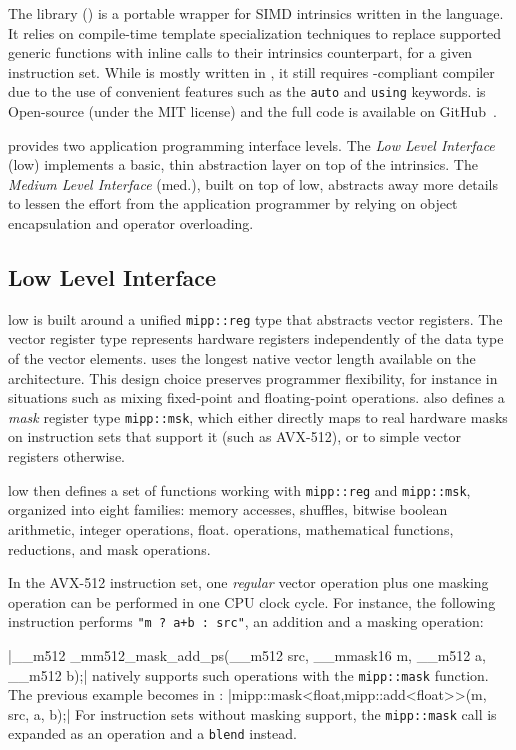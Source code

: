 The \longMIPP library (\MIPP) is a portable wrapper for SIMD intrinsics written
in the \Cxx language. It relies on \Cxx compile-time template specialization
techniques to replace supported generic functions with inline calls to their
intrinsics counterpart, for a given instruction set. While \MIPP is mostly
written in , it still requires -compliant compiler due to the
use of convenient features such as the \verb|auto| and \verb|using| keywords.
\MIPP is Open-source (under the MIT license) and the full code is available on
GitHub~\cite{Cassagne2018}.

\MIPP provides two application programming interface levels. The
\emph{Low Level Interface} (low) implements a basic, thin abstraction layer on
top of the intrinsics. The \emph{Medium Level Interface} (med.), built on top of
\MIPP low, abstracts away more details to lessen the effort from the application
programmer by relying on object encapsulation and operator overloading.

\subsection{Low Level Interface}

\MIPP low is built around a unified \verb|mipp::reg| type that abstracts vector
registers. The vector register type represents hardware registers independently
of the data type of the vector elements. \MIPP uses the longest native vector
length available on the architecture. This design choice preserves programmer
flexibility, for instance in situations such as mixing fixed-point and
floating-point operations. \MIPP also defines a \emph{mask} register type
\verb|mipp::msk|, which either directly maps to real hardware masks on
instruction sets that support it (such as AVX-512), or to simple vector
registers otherwise.

\MIPP low then defines a set of functions working with \verb|mipp::reg| and
\verb|mipp::msk|, organized into eight families: memory accesses, shuffles,
bitwise boolean arithmetic, integer operations, float. operations, mathematical
functions, reductions, and mask operations.

In the AVX-512 instruction set, one \textit{regular} vector operation plus one
masking operation can be performed in one CPU clock cycle. For instance, the
following instruction performs \verb|"m ? a+b : src"|, an addition and a masking
operation:

|__m512 _mm512_mask_add_ps(__m512 src, __mmask16 m, __m512 a, __m512 b);|
{\noindent
\MIPP natively supports such operations with the \verb|mipp::mask| function. The
previous example becomes in \MIPP:
}
|mipp::mask<float,mipp::add<float>>(m, src, a, b);|
{\noindent
For instruction sets without masking support, the \verb|mipp::mask| call is
expanded as an operation and a \verb|blend| instead.
}
